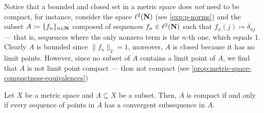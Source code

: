 \begin{remark}
\label{rem:closed-and-bounded-not-compact}
Notice that a bounded and closed set in a metric space does \emph{not} need to
be compact, for instance, consider the space \(\ell^2(\mathbf{N})\) (see
\cref{exp:p-norms}) and the subset \(A \coloneq \{f_n\}_{n \in \mathbf{N}}\) composed of
sequences \(f_n \in \ell^2(\mathbf{N})\) such that \(f_n(j) \coloneq \delta_{n j}\) ---
that is, sequences where the only nonzero term is the \(n\)-th one, which equals
\(1\). Clearly \(A\) is bounded since \(\| f_{n} \|_2 = 1\), moreover, \(A\) is
closed because it has no limit points. However, since no subset of \(A\)
contains a limit point of \(A\), we find that \(A\) is not limit point compact
--- thus not compact (see \cref{prop:metric-space-compactness-equivalences})
\end{remark}

\begin{proposition}
\label{prop:convergent-subsequence-implies-compact}
Let \(X\) be a metric space and \(A \subseteq X\) be a subset. Then, \(A\) is
compact if and only if every sequence of points in \(A\) has a convergent
subsequence in \(A\).
\end{proposition}



